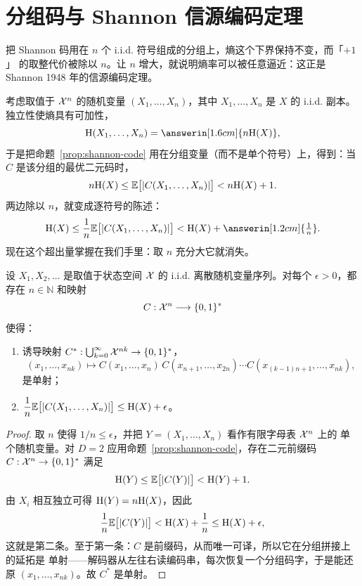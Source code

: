 \section{分组码与 Shannon 信源编码定理}\label{sec:block-codes}
\quad{}

\begin{strand}
把 Shannon 码用在 $n$ 个 i.i.d. 符号组成的分组上，熵这个下界保持不变，而「$+1$」
的取整代价被除以 $n$。让 $n$ 增大，就说明熵率可以被任意逼近：这正是 Shannon 1948
年的信源编码定理。
\end{strand}



考虑取值于 $\mathcal{X}^n$ 的随机变量 $(X_1,\ldots,X_n)$，其中 $X_1,\ldots,X_n$ 是 $X$ 的
i.i.d. 副本。独立性使熵具有可加性，
\[
  \Ent(X_1,\ldots,X_n)=\answerin[1.6cm]{n\Ent(X)},
\]
于是把命题~\ref{prop:shannon-code} 用在分组变量（而不是单个符号）上，得到：当 $C$
是该分组的最优二元码时，
\[
  n\mathrm{H}(X)\le\mathbb{E}\bigl[|C(X_1,\ldots,X_n)|\bigr]<n\mathrm{H}(X)+1 .
\]
两边除以 $n$，就变成逐符号的陈述：
\[
  \Ent(X)
  \le\frac1n\E\bigl[|C(X_1,\ldots,X_n)|\bigr]
  <\Ent(X)+\answerin[1.2cm]{\tfrac1n}.
\]
现在这个超出量掌握在我们手里：取 $n$ 充分大它就消失。


\begin{theorem}\label{thm:shannon-source-coding}
设 $X_1,X_2,\ldots$ 是取值于状态空间 $\mathcal{X}$ 的 i.i.d. 离散随机变量序列。对每个
$\epsilon>0$，都存在 $n\in\mathbb{N}$ 和映射
\[
  C:\mathcal{X}^n\longrightarrow\{0,1\}^*
\]
使得：
\begin{enumerate}
  \item 诱导映射 $C^*:\bigcup_{k=0}^\infty\mathcal{X}^{nk}\to\{0,1\}^*$，
  \[
    (x_1,\ldots,x_{nk})
    \longmapsto
    C(x_1,\ldots,x_n)\,C(x_{n+1},\ldots,x_{2n})
    \cdots C(x_{(k-1)n+1},\ldots,x_{nk}),
  \]
  是单射；
  \item $\displaystyle
  \frac1n\mathbb{E}\bigl[|C(X_1,\ldots,X_n)|\bigr]\le\mathrm{H}(X)+\epsilon$。
\end{enumerate}
\end{theorem}

\begin{proof}
取 $n$ 使得 $1/n\le\epsilon$，并把 $Y=(X_1,\ldots,X_n)$ 看作有限字母表 $\mathcal{X}^n$ 上的
单个随机变量。对 $D=2$ 应用命题~\ref{prop:shannon-code}，存在二元前缀码
$C:\mathcal{X}^n\to\{0,1\}^*$ 满足
\[
  \mathrm{H}(Y)\le\mathbb{E}\bigl[|C(Y)|\bigr]<\mathrm{H}(Y)+1 .
\]
由 $X_i$ 相互独立可得 $\mathrm{H}(Y)=n\mathrm{H}(X)$，因此
\[
  \frac1n\mathbb{E}\bigl[|C(Y)|\bigr]<\mathrm{H}(X)+\frac1n\le\mathrm{H}(X)+\epsilon,
\]
这就是第二条。至于第一条：$C$ 是前缀码，从而唯一可译，所以它在分组拼接上的延拓是
单射——解码器从左往右读编码串，每次恢复一个分组码字，于是能还原
$(x_1,\ldots,x_{nk})$。故 $C^*$ 是单射。
\end{proof}

